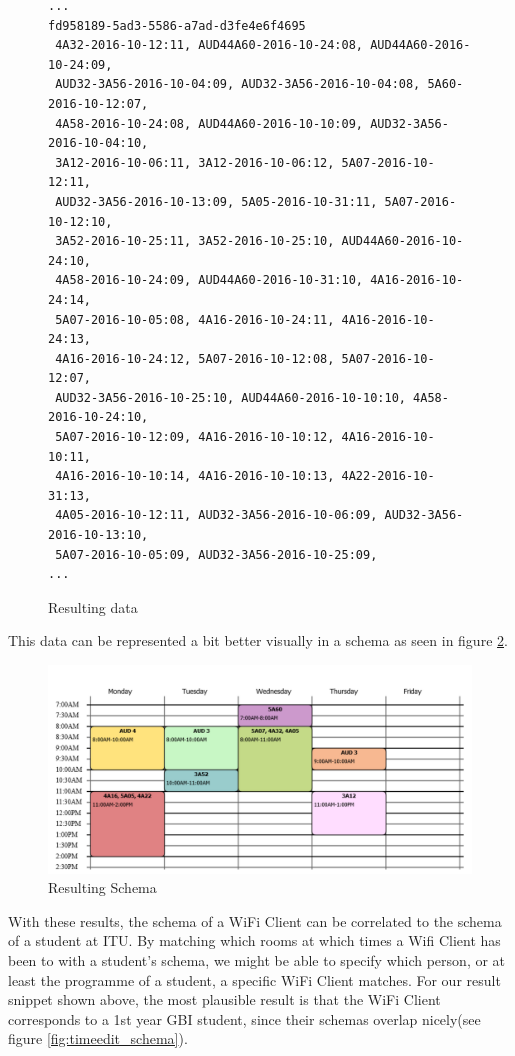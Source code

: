 \begin{figure}[H]
	\begin{lstlisting}[frame=single, backgroundcolor=\color{light-gray}, basicstyle=\footnotesize\ttfamily]
...
fd958189-5ad3-5586-a7ad-d3fe4e6f4695	
 4A32-2016-10-12:11, AUD44A60-2016-10-24:08, AUD44A60-2016-10-24:09, 
 AUD32-3A56-2016-10-04:09, AUD32-3A56-2016-10-04:08, 5A60-2016-10-12:07, 
 4A58-2016-10-24:08, AUD44A60-2016-10-10:09, AUD32-3A56-2016-10-04:10, 
 3A12-2016-10-06:11, 3A12-2016-10-06:12, 5A07-2016-10-12:11, 
 AUD32-3A56-2016-10-13:09, 5A05-2016-10-31:11, 5A07-2016-10-12:10,
 3A52-2016-10-25:11, 3A52-2016-10-25:10, AUD44A60-2016-10-24:10,
 4A58-2016-10-24:09, AUD44A60-2016-10-31:10, 4A16-2016-10-24:14,
 5A07-2016-10-05:08, 4A16-2016-10-24:11, 4A16-2016-10-24:13,
 4A16-2016-10-24:12, 5A07-2016-10-12:08, 5A07-2016-10-12:07,
 AUD32-3A56-2016-10-25:10, AUD44A60-2016-10-10:10, 4A58-2016-10-24:10,
 5A07-2016-10-12:09, 4A16-2016-10-10:12, 4A16-2016-10-10:11,
 4A16-2016-10-10:14, 4A16-2016-10-10:13, 4A22-2016-10-31:13,
 4A05-2016-10-12:11, AUD32-3A56-2016-10-06:09, AUD32-3A56-2016-10-13:10,
 5A07-2016-10-05:09, AUD32-3A56-2016-10-25:09,
...
	\end{lstlisting}
	\caption{Resulting data}
	\label{fig:result_data}
\end{figure}

\newpar This data can be represented a bit better visually in a schema as seen in figure \ref{fig:result_schema}.

\begin{figure}[H]
	\centering
	\includegraphics[width=\linewidth]{figures/schema-from-data.png}
	\caption{Resulting Schema}
	\label{fig:result_schema}
\end{figure}

\newpar With these results, the schema of a WiFi Client can be correlated to the schema of a student at ITU. By matching which rooms at which times a Wifi Client has been to with a student's schema, we might be able to specify which person, or at least the programme of a student, a specific WiFi Client matches. For our result snippet shown above, the most plausible result is that the WiFi Client corresponds to a 1st year GBI student, since their schemas overlap nicely(see figure \ref{fig:timeedit_schema}).

